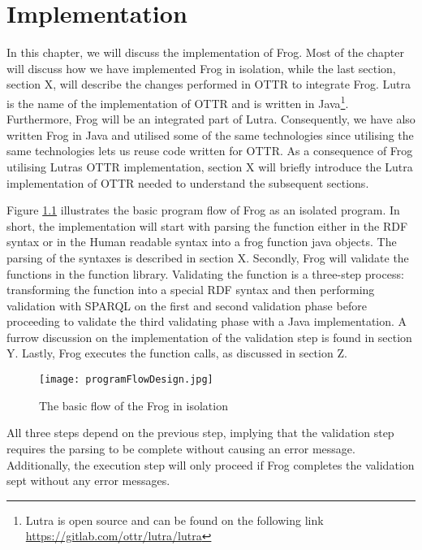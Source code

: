 
\chapter{Implementation}
In this chapter, we will discuss the implementation of Frog. Most of the chapter will discuss how we have implemented Frog in isolation, while the last section, section X, will describe the changes performed in OTTR to integrate Frog. Lutra is the name of the implementation of OTTR and is written in Java\footnote{Lutra is open source and can be found on the following link \url{https://gitlab.com/ottr/lutra/lutra}}. Furthermore, Frog will be an integrated part of Lutra. Consequently, we have also written Frog in Java and utilised some of the same technologies since utilising the same technologies lets us reuse code written for OTTR. As a consequence of Frog utilising Lutras OTTR implementation, section X will briefly introduce the Lutra implementation of OTTR needed to understand the subsequent sections. 

\para
Figure \ref{fig:basic_program_flow} illustrates the basic program flow of Frog as an isolated program. In short, the implementation will start with parsing the function either in the RDF syntax or in the Human readable syntax into a frog function java objects. The parsing of the syntaxes is described in section X. Secondly, Frog will validate the functions in the function library. Validating the function is a three-step process: transforming the function into a special RDF syntax and then performing validation with SPARQL on the first and second validation phase before proceeding to validate the third validating phase with a Java implementation. A furrow discussion on the implementation of the validation step is found in section Y. Lastly, Frog executes the function calls, as discussed in section Z.

\begin{figure}
  \centering
  \texttt{[image: programFlowDesign.jpg]}
  \caption{The basic flow of the Frog in isolation}
  \label{fig:basic_program_flow}
\end{figure}
\para
All three steps depend on the previous step, implying that the validation step requires the parsing to be complete without causing an error message. Additionally, the execution step will only proceed if Frog completes the validation sept without any error messages.  

